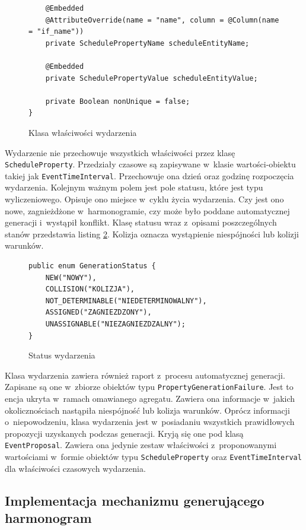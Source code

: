 \documentclass[a4paper]{book}
\begin{document}
{\begin{figure}
\begin{lstlisting}
	@Embedded
	@AttributeOverride(name = "name", column = @Column(name = "if_name"))
	private SchedulePropertyName scheduleEntityName;
	
	@Embedded
	private SchedulePropertyValue scheduleEntityValue;
	
	private Boolean nonUnique = false;
}
\end{lstlisting}
\caption{Klasa właściwości wydarzenia}
\label{id:fig:listing:ScheduleProperty}
\end{figure}

Wydarzenie nie przechowuje wszystkich właściwości przez klasę \lstinline|ScheduleProperty|. Przedziały czasowe są zapisywane w~klasie wartości-obiektu takiej jak \lstinline|EventTimeInterval|. Przechowuje ona dzień oraz godzinę rozpoczęcia wydarzenia. Kolejnym ważnym polem jest pole statusu, które jest typu wyliczeniowego. Opisuje ono miejsce w~cyklu życia wydarzenia. Czy jest ono nowe, zagnieżdżone w~harmonogramie, czy może było poddane automatycznej generacji i~wystąpił konflikt. Klasę statusu wraz z~opisami poszczególnych stanów przedstawia listing \ref{id:fig:listing:GenerationStatus}. Kolizja oznacza wystąpienie niespójności lub kolizji warunków.
\begin{figure}
\begin{lstlisting}
public enum GenerationStatus {
	NEW("NOWY"),
	COLLISION("KOLIZJA"),
	NOT_DETERMINABLE("NIEDETERMINOWALNY"),
	ASSIGNED("ZAGNIEZDZONY"),
	UNASSIGNABLE("NIEZAGNIEZDZALNY");
}
\end{lstlisting}
\caption{Status wydarzenia}
\label{id:fig:listing:GenerationStatus}
\end{figure}

Klasa wydarzenia zawiera również raport z~procesu automatycznej generacji. Zapisane są one w~zbiorze obiektów typu \lstinline|PropertyGenerationFailure|. Jest to encja ukryta w~ramach omawianego agregatu. Zawiera ona informacje w~jakich okolicznościach nastąpiła niespójność lub kolizja warunków. Oprócz informacji o~niepowodzeniu, klasa wydarzenia jest w~posiadaniu wszystkich prawidłowych propozycji uzyskanych podczas generacji. Kryją się one pod klasą \lstinline|EventProposal|. Zawiera ona jedynie zestaw właściwości z~proponowanymi wartościami w~formie obiektów typu \lstinline|ScheduleProperty| oraz \lstinline|EventTimeInterval| dla właściwości czasowych wydarzenia.

\subsection{Implementacja mechanizmu generującego harmonogram}
\label{implMechanizmuGen}

}
\end{document}
